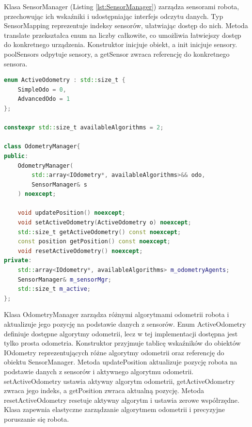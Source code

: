 \documentclass[12pt,twoside]{article}
\begin{document}
Klasa SensorManager (Listing \ref{lst:SensorManager}) zarządza sensorami robota, przechowując ich wskaźniki i udostępniając interfejs odczytu danych. Typ SensorMapping reprezentuje indeksy sensorów, ułatwiając dostęp do nich. Metoda translate przekształca enum na liczby całkowite, co umożliwia łatwiejszy dostęp do konkretnego urządzenia. Konstruktor inicjuje obiekt, a init inicjuje sensory. poolSensors odpytuje sensory, a getSensor zwraca referencję do konkretnego sensora.

\newpage

\begin{lstlisting}[language=C++, caption={Klasa OdometryManager}, label={lst:OdometryManager}]
enum ActiveOdometry : std::size_t {
    SimpleOdo = 0,
    AdvancedOdo = 1
};

constexpr std::size_t availableAlgorithms = 2;

class OdometryManager{
public:
    OdometryManager(
        std::array<IOdometry*, availableAlgorithms>&& odo,
        SensorManager& s
    ) noexcept;

    void updatePosition() noexcept;
    void setActiveOdometry(ActiveOdometry o) noexcept;
    std::size_t getActiveOdometry() const noexcept;
    const position getPosition() const noexcept;
    void resetActiveOdometry() noexcept;
private:
    std::array<IOdometry*, availableAlgorithms> m_odometryAgents;
    SensorManager& m_sensorMgr;
    std::size_t m_active;
};
\end{lstlisting}

Klasa OdometryManager zarządza różnymi algorytmami odometrii robota i aktualizuje jego pozycję na podstawie danych z sensorów. Enum ActiveOdometry definiuje dostępne algorytmy odometrii, lecz w tej implementacji dostępna jest tylko prosta odometria. Konstruktor przyjmuje tablicę wskaźników do obiektów IOdometry reprezentujących różne algorytmy odometrii oraz referencję do obiektu SensorManager. Metoda updatePosition aktualizuje pozycję robota na podstawie danych z sensorów i aktywnego algorytmu odometrii. setActiveOdometry ustawia aktywny algorytm odometrii, getActiveOdometry zwraca jego indeks, a getPosition zwraca aktualną pozycję. Metoda resetActiveOdometry resetuje aktywny algorytm i ustawia zerowe współrzędne. Klasa zapewnia elastyczne zarządzanie algorytmem odometrii i precyzyjne poruszanie się robota.
\end{document}
